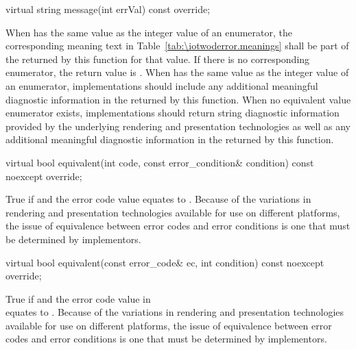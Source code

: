 \begin{itemdecl}
virtual string message(int errVal) const override;
\end{itemdecl}
\begin{itemdescr}
	\pnum
	\returns
	When  has the same value as the integer value of an 
	 enumerator, the corresponding meaning text in 
	Table~\ref{tab:\iotwoderror.meanings} shall be part of the 
	 returned by this function for that value. If there is no 
	corresponding enumerator, the return value is 
	.
	\enternote
	When  has the same value as the integer value of an 
	 enumerator, implementations should include any 
	additional meaningful diagnostic information in the  returned 
	by this function. When no equivalent value enumerator exists, 
	implementations should return string diagnostic information provided by the 
	underlying rendering and presentation technologies as well as any 
	additional meaningful diagnostic information in the  returned 
	by this function.
	\exitnote
	
\end{itemdescr}

\begin{itemdecl}
virtual bool equivalent(int code,
  const error_condition& condition) const noexcept override;
\end{itemdecl}
\begin{itemdescr}
	\pnum
	\returns
	True if  and the  error code value  equates to .
	\enternote
	Because of the variations in rendering and presentation technologies 
	available for use on different platforms, the issue of equivalence between 
	error codes and error conditions is one that must be determined by 
	implementors.
	\exitnote
\end{itemdescr}
\begin{itemdecl}
virtual bool equivalent(const error_code& ec,
  int condition) const noexcept override;
\end{itemdecl}
\begin{itemdescr}
	\pnum
	\returns
	True if  and the  error code value in\\  equates to .
	\enternote
	Because of the variations in rendering and presentation technologies 
	available for use on different platforms, the issue of equivalence between 
	error codes and error conditions is one that must be determined by 
	implementors.
	\exitnote
\end{itemdescr}


